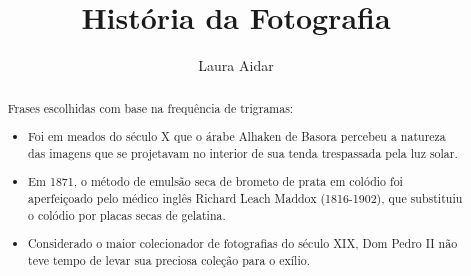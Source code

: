 \documentclass{article}
\title{História da Fotografia}
\author{Laura Aidar}
\begin{document}
\maketitle

\begin{abstract}
Frases escolhidas com base na frequência de trigramas:
\begin{itemize}
\item Foi em meados do século X que o árabe Alhaken de Basora percebeu a natureza das imagens que se projetavam no interior de sua tenda trespassada pela luz solar.
\item Em 1871, o método de emulsão seca de brometo de prata em colódio foi aperfeiçoado pelo médico inglês Richard Leach Maddox (1816-1902), que substituiu o colódio por placas secas de gelatina.
\item Considerado o maior colecionador de fotografias do século XIX, Dom Pedro II não teve tempo de levar sua preciosa coleção para o exílio.
 
\end{itemize}
\end{abstract}
\end{document}
